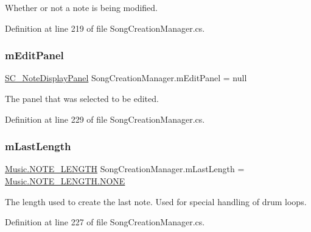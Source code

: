 Whether or not a note is being modified. 



Definition at line 219 of file Song\+Creation\+Manager.\+cs.

\mbox{\label{group___s_c_m_priv_var_gad063b650cf7112be19edaf1a2033ea4d}} 
\subsubsection{\texorpdfstring{m\+Edit\+Panel}{mEditPanel}}
{\footnotesize\ttfamily \hyperlink{class_s_c___note_display_panel}{S\+C\+\_\+\+Note\+Display\+Panel} Song\+Creation\+Manager.\+m\+Edit\+Panel = null\hspace{0.3cm}{\ttfamily [private]}}



The panel that was selected to be edited. 



Definition at line 229 of file Song\+Creation\+Manager.\+cs.

\mbox{\label{group___s_c_m_priv_var_gaa137adb1c99e9ee59adcfbf7d0cf6249}} 
\subsubsection{\texorpdfstring{m\+Last\+Length}{mLastLength}}
{\footnotesize\ttfamily \hyperlink{group___music_enums_gaf11b5f079adbb21c800b9eca1c5c3cbd}{Music.\+N\+O\+T\+E\+\_\+\+L\+E\+N\+G\+TH} Song\+Creation\+Manager.\+m\+Last\+Length = \hyperlink{group___music_enums_ggaf11b5f079adbb21c800b9eca1c5c3cbdab50339a10e1de285ac99d4c3990b8693}{Music.\+N\+O\+T\+E\+\_\+\+L\+E\+N\+G\+T\+H.\+N\+O\+NE}\hspace{0.3cm}{\ttfamily [private]}}



The length used to create the last note. Used for special handling of drum loops. 



Definition at line 227 of file Song\+Creation\+Manager.\+cs.



